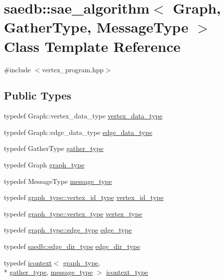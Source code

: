 \hypertarget{classsaedb_1_1sae__algorithm}{\section{saedb\-:\-:sae\-\_\-algorithm$<$ Graph, Gather\-Type, Message\-Type $>$ Class Template Reference}
\label{d0/d9f/classsaedb_1_1sae__algorithm}
}


{\ttfamily \#include $<$vertex\-\_\-program.\-hpp$>$}

\subsection*{Public Types}
\begin{DoxyCompactItemize}
\item 
typedef Graph\-::vertex\-\_\-data\-\_\-type \hyperlink{classsaedb_1_1sae__algorithm_a709b55d6063cfd2c5f0dcdb17d6d5258}{vertex\-\_\-data\-\_\-type}
\item 
typedef Graph\-::edge\-\_\-data\-\_\-type \hyperlink{classsaedb_1_1sae__algorithm_a1d3acc631f0a3e22c830c91dcf104c8a}{edge\-\_\-data\-\_\-type}
\item 
typedef Gather\-Type \hyperlink{classsaedb_1_1sae__algorithm_a4c57e65dd3987f19d5d90bf394c8f2f8}{gather\-\_\-type}
\item 
typedef Graph \hyperlink{classsaedb_1_1sae__algorithm_a87749c5b779e21642c2928b746556540}{graph\-\_\-type}
\item 
typedef Message\-Type \hyperlink{classsaedb_1_1sae__algorithm_a757eb6dffc652f91f2c10a24f6596156}{message\-\_\-type}
\item 
typedef \hyperlink{classsaedb_1_1sae__graph_a2f9a7bf2db556689f1cd9de9562ff41f}{graph\-\_\-type\-::vertex\-\_\-id\-\_\-type} \hyperlink{classsaedb_1_1sae__algorithm_a943e87163aee5f148d7a7c68be72b123}{vertex\-\_\-id\-\_\-type}
\item 
typedef \hyperlink{structsaedb_1_1sae__graph_1_1vertex__type}{graph\-\_\-type\-::vertex\-\_\-type} \hyperlink{classsaedb_1_1sae__algorithm_ae26abf349aed2b0c9f82e1396b78561a}{vertex\-\_\-type}
\item 
typedef \hyperlink{classsaedb_1_1sae__graph_1_1edge__type}{graph\-\_\-type\-::edge\-\_\-type} \hyperlink{classsaedb_1_1sae__algorithm_aaebb1836596e0efad3d694a5b829871f}{edge\-\_\-type}
\item 
typedef \hyperlink{namespacesaedb_adf5ad13c09a48fb2f42f8e7348ea3ac3}{saedb\-::edge\-\_\-dir\-\_\-type} \hyperlink{classsaedb_1_1sae__algorithm_a0918d4a10cf91f715a686560b5b95b03}{edge\-\_\-dir\-\_\-type}
\item 
typedef \hyperlink{classsaedb_1_1icontext}{icontext}$<$ \hyperlink{classsaedb_1_1sae__algorithm_a87749c5b779e21642c2928b746556540}{graph\-\_\-type}, \\*
\hyperlink{classsaedb_1_1sae__algorithm_a4c57e65dd3987f19d5d90bf394c8f2f8}{gather\-\_\-type}, \hyperlink{classsaedb_1_1sae__algorithm_a757eb6dffc652f91f2c10a24f6596156}{message\-\_\-type} $>$ \hyperlink{classsaedb_1_1sae__algorithm_a190f07adbc04f0188ad09b50dbe93a33}{icontext\-\_\-type}
\end{DoxyCompactItemize}
